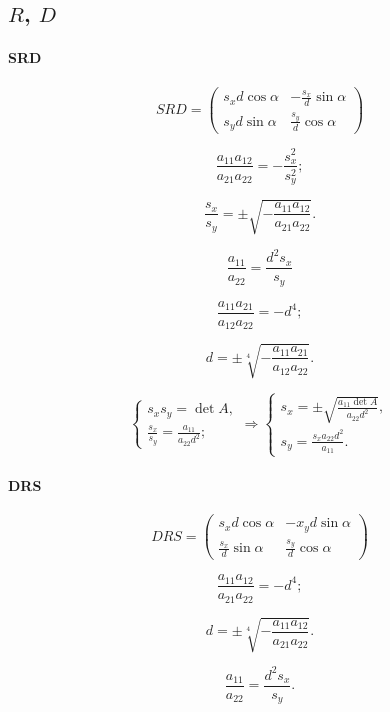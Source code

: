 \subsection{$R$, $D$}

\paragraph{SRD}

$$SRD =
\begin{pmatrix}
	s_x d \cos\alpha & -\frac{s_x}{d}\sin\alpha \\
	s_y d \sin\alpha & \frac{s_y}{d}\cos\alpha
\end{pmatrix}$$

$$\frac{a_{11} a_{12}}{a_{21} a_{22}} = - \frac{s_x^2}{s_y^2};$$

$$\frac{s_x}{s_y} = \pm \sqrt{-\frac{a_{11} a_{12}}{a_{21} a_{22}}}.$$

$$\frac{a_{11}}{a_{22}} = \frac{d^2 s_x}{s_y}$$

$$\frac{a_{11} a_{21}}{a_{12} a_{22}} = -d^4;$$

$$d = \pm \sqrt[4]{-\frac{a_{11} a_{21}}{a_{12} a_{22}}}.$$

$$\begin{cases}
	s_x s_y = \det A,\\
	\frac{s_x}{s_y} = \frac{a_{11}}{a_{22} d^2};
\end{cases}
\Rightarrow
\begin{cases}
	s_x = \pm \sqrt{\frac{a_{11} \det A}{a_{22} d^2}},\\
	s_y = \frac{s_x a_{22} d^2}{a_{11}}.
\end{cases}
$$

\paragraph{DRS}
$$DRS = 
\begin{pmatrix}
	s_x d \cos\alpha & - x_y d \sin\alpha \\
	\frac{s_x}{d} \sin\alpha & \frac{s_y}{d} \cos\alpha
\end{pmatrix}$$

$$\frac{a_{11} a_{12}}{a_{21} a_{22}} = - d^4;$$

$$d = \pm \sqrt[4]{-\frac{a_{11} a_{12}}{a_{21} a_{22}} }.$$

$$\frac{a_{11}}{a_{22}} = \frac{d^2 s_x}{s_y}.$$